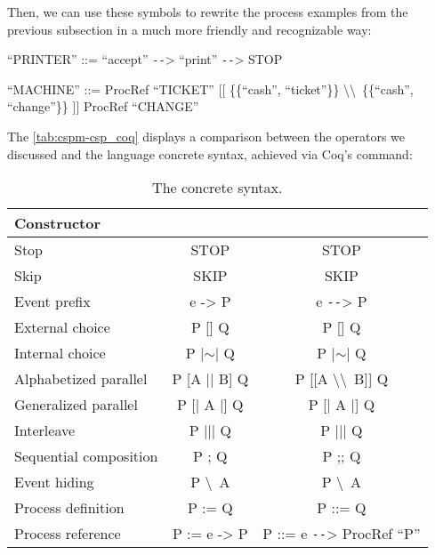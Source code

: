 Then, we can use these symbols to rewrite the process examples from the previous subsection in a much more friendly and recognizable way:

\begin{flushleft}
	``PRINTER'' ::= ``accept'' \texttt{-{}-}> ``print'' \texttt{-{}-}> STOP

	``MACHINE'' ::= ProcRef ``TICKET'' [[ \{\{``cash'', ``ticket''\}\} \textbackslash\textbackslash \ \{\{``cash'', ``change''\}\} ]] ProcRef ``CHANGE''
\end{flushleft}

The \autoref{tab:cspm-csp_coq} displays a comparison between the \CSPM{} operators we discussed and the \CSPcoq{} language concrete syntax, achieved via Coq's  command:

\begin{table}[htb]
	\begin{center}
		\caption[The \CSPcoq{} concrete syntax]{The \CSPcoq{} concrete syntax.}
		\label{tab:cspm-csp_coq}
		\begin{tabular}{ |l|c|c| }
			\hline
			Constructor & \CSPM{} & \CSPcoq{} \\
			\hline
			Stop & STOP & STOP \\ [0.5ex]
			Skip & SKIP & SKIP \\ [0.5ex]
			Event prefix & e -> P & e \texttt{-{}-}> P \\  [0.5ex]
			External choice & P [] Q & P [] Q \\  [0.5ex]
			Internal choice & P |$ \sim $| Q & P |$ \sim $| Q \\ [0.5ex]
			Alphabetized parallel & P [A || B] Q & P [[A \textbackslash\textbackslash \ B]] Q \\ [0.5ex]
			Generalized parallel & P [| A |] Q & P [| A |] Q \\ [0.5ex]
			Interleave & P ||| Q & P ||| Q \\ [0.5ex]
			Sequential composition & P ; Q & P ;; Q \\ [0.5ex]
			Event hiding & P \textbackslash \ A & P \textbackslash \ A \\ [0.5ex]
			Process definition & P := Q & P ::= Q \\ [0.5ex]
			Process reference & P := e -> P & P ::= e \texttt{-{}-}> ProcRef ``P'' \\ [0.5ex]
			\hline
		\end{tabular}
	\end{center}
\end{table}

